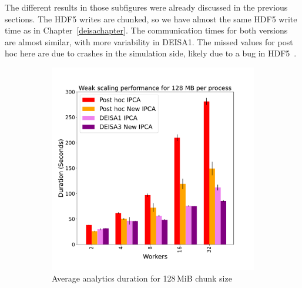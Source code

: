 The different results in those subfigures were already discussed in the previous sections. The HDF5 writes are chunked, so we have almost the same HDF5 write time as in Chapter~\ref{deisachapter}.
The communication times for both \deisa versions are almost similar, with more variability in DEISA1.  
The missed values for post hoc here are due to crashes in the simulation side, likely due to a bug in HDF5~\cite{large_2023}.

\begin{figure}[h!]
     \centering
     \begin{subfigure}[b]{0.3\textwidth}
         \centering
         \includegraphics[width=\textwidth, height=\textwidth]{figures/128A_1vs3vspost1vspost2.pdf}
         \caption{Average analytics duration for 128\,MiB chunk size }
         \label{fig:A1128_1_3_p}
     \end{subfigure}
     \hfill
     \begin{subfigure}[b]{0.3\textwidth}
         \centering

\end{subfigure}
\end{figure}
